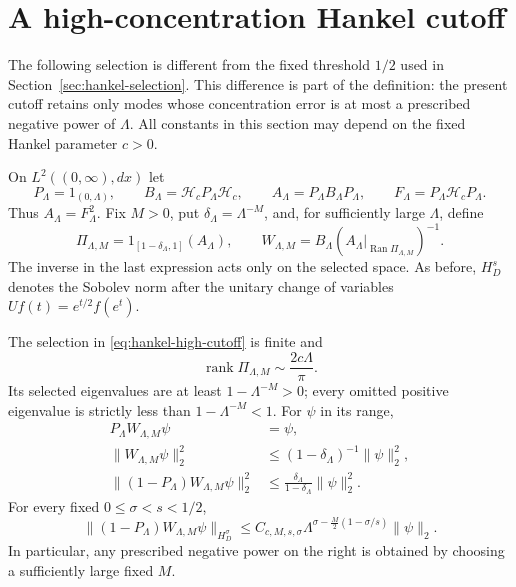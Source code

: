 \section{A high-concentration Hankel cutoff}
\label{sec:hankel-high-concentration}

The following selection is different from the fixed threshold
$1/2$ used in Section~\ref{sec:hankel-selection}. This difference is
part of the definition: the present cutoff retains only modes whose
concentration error is at most a prescribed negative power of
$\Lambda$. All constants in this section may depend on the fixed
Hankel parameter $c>0$.

On $L^2((0,\infty),dx)$ let
\[
 P_\Lambda=1_{(0,\Lambda)},\qquad
 B_\Lambda=\mathcal H_cP_\Lambda\mathcal H_c,\qquad
 A_\Lambda=P_\Lambda B_\Lambda P_\Lambda,
 \qquad F_\Lambda=P_\Lambda\mathcal H_cP_\Lambda.
\]
Thus $A_\Lambda=F_\Lambda^2$. Fix $M>0$, put
$\delta_\Lambda=\Lambda^{-M}$, and, for sufficiently large $\Lambda$,
define
\begin{equation}
 \label{eq:hankel-high-cutoff}
 \Pi_{\Lambda,M}=1_{[1-\delta_\Lambda,1]}(A_\Lambda),
 \qquad
 W_{\Lambda,M}=B_\Lambda
       (A_\Lambda|_{\operatorname{Ran}\Pi_{\Lambda,M}})^{-1}.
\end{equation}
The inverse in the last expression acts only on the selected space.
As before, $H_D^s$ denotes the Sobolev norm after the unitary change
of variables $Uf(t)=e^{t/2}f(e^t)$.

\begin{proposition}
\label{prop:hankel-high-cutoff}
The selection in \eqref{eq:hankel-high-cutoff} is finite and
\begin{equation}
 \label{eq:hankel-high-rank}
 \operatorname{rank}\Pi_{\Lambda,M}
                 \sim\frac{2c\Lambda}{\pi}.
\end{equation}
Its selected eigenvalues are at least $1-\Lambda^{-M}>0$;
every omitted positive eigenvalue is strictly less than
$1-\Lambda^{-M}<1$. For $\psi$ in its range,
\begin{align}
 P_\Lambda W_{\Lambda,M}\psi&=\psi,\label{eq:high-right-inverse}\\
 \|W_{\Lambda,M}\psi\|_2^2
        &\leq(1-\delta_\Lambda)^{-1}\|\psi\|_2^2,\label{eq:high-extension-norm}\\
 \|(1-P_\Lambda)W_{\Lambda,M}\psi\|_2^2
        &\leq\frac{\delta_\Lambda}{1-\delta_\Lambda}
                                      \|\psi\|_2^2.\label{eq:high-raw-tail}
\end{align}
For every fixed $0\leq\sigma<s<1/2$,
\begin{equation}
 \label{eq:high-graph-tail}
 \|(1-P_\Lambda)W_{\Lambda,M}\psi\|_{H_D^\sigma}
 \leq C_{c,M,s,\sigma}
       \Lambda^{\sigma-\frac M2(1-\sigma/s)}\|\psi\|_2.
\end{equation}
In particular, any prescribed negative power on the right is
obtained by choosing a sufficiently large fixed $M$.
\end{proposition}

